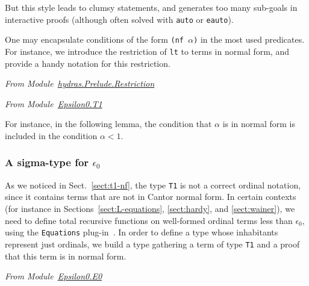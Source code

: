 

\vspace{4pt}


But this style leads to clumsy statements, and generates too many sub-goals in interactive proofs (although often solved with \texttt{auto} or \texttt{eauto}).

One may encapsulate conditions of the form \texttt{(nf $\alpha$)} in
the most used predicates. For instance, we introduce the restriction of \texttt{lt} to terms in normal form, and provide a handy notation for this restriction.

\vspace{4pt}
\emph{From Module~\href{../theories/html/hydras.Prelude.Restriction.html}{hydras.Prelude.Restriction}}



\vspace{4pt}
\emph{From Module~\href{../theories/html/hydras.Epsilon0.T1.html\#LT}{Epsilon0.T1}}



\label{Predicates:LT-T1}
 

For instance, in the following lemma, the condition that $\alpha$ is in normal form is included in the condition $\alpha< 1$.




\subsubsection{A sigma-type for \texorpdfstring{$\epsilon_0$}{epsilon0}}

As we noticed in Sect.~\ref{sect:t1-nf}, the type \texttt{T1} is not a correct ordinal notation, since it contains terms that are not in Cantor normal form. In certain contexts (for instance in Sections~\ref{sect:L-equations}, \ref{sect:hardy},
and \ref{sect:wainer}),  we need to define total recursive functions on well-formed ordinal terms less  than $\epsilon_0$, using the \texttt{Equations} plug-in~\cite{sozeau:hal-01671777}.
 In order to define a type whose inhabitants represent just ordinals, we build a type gathering a term of type \texttt{T1} and a proof that this term is in normal form.
 

\label{sect:E0-def}
\label{types:E0}

\emph{From Module~\href{../theories/html/hydras.Epsilon0.E0.html}{Epsilon0.E0}}

